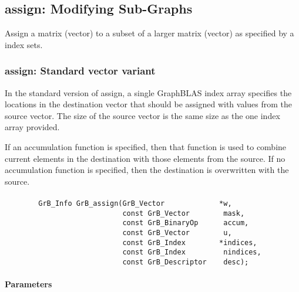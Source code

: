 \subsection{{\sf assign}: Modifying Sub-Graphs}
\label{Sec:assign}

Assign a matrix (vector) to a subset  of a larger matrix (vector) as specified by a index sets.



\subsubsection{{\sf assign}: Standard vector variant}

In the standard version of {\sf assign}, a single GraphBLAS index array specifies
the locations in the destination vector that should be assigned with values
from the source vector.  The size of the source vector is the same size as the one
index array provided.

If an accumulation function is specified, then that function is used
to combine current elements in the destination with those elements
from the source.  If no accumulation function is specified, then the
destination is overwritten with the source.


\paragraph{\syntax}

\begin{verbatim}
        GrB_Info GrB_assign(GrB_Vector             *w,
                            const GrB_Vector        mask,
                            const GrB_BinaryOp      accum,
                            const GrB_Vector        u,
                            const GrB_Index        *indices,
                            const GrB_Index         nindices,
                            const GrB_Descriptor    desc);
\end{verbatim}

\paragraph{Parameters}

